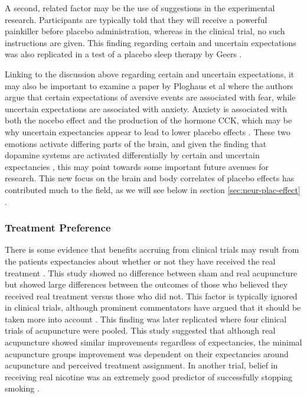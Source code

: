 A second, related factor may be the use of suggestions in the experimental research. Participants are typically told that they will receive a powerful painkiller before placebo administration, whereas in the clinical trial, no such instructions are given. This finding regarding certain and uncertain expectations was also replicated in a test of a placebo sleep therapy by Geers  \cite{Geers2005a}.

Linking to the discussion above regarding certain and uncertain expectations, it may also be important to examine a paper by Ploghaus et al \cite{Ploghaus2003} where the authors argue that certain expectations of aversive events are associated with fear, while uncertain expectations are associated with anxiety. Anxiety is associated with both the nocebo effect and the production of the hormone CCK, which may be why uncertain expectancies appear to lead to lower placebo effects \cite{Colloca2008b}. These two emotions activate differing parts of the brain, and given the finding that dopamine systems are activated differentially by certain and uncertain expectancies \cite{Scott2007a}, this may point towards some important future avenues for research. This new focus on the brain and body correlates of placebo effects has contributed much to the field, as we will see below in section \ref{sec:neur-plac-effect} .

\subsubsection{Treatment Preference}
\label{sec:treatment-preference}


There is some evidence that benefits accruing from clinical trials may result from the patients expectancies about whether or not they have received the real treatment \cite{Bausell2005}. This study showed no difference between sham and real acupuncture but showed large differences between the outcomes of those who believed they received real treatment versus those who did not. This factor is typically ignored in clinical trials, although prominent commentators have argued that it should be taken more into account \cite{Benedetti2007}. This finding was later replicated \cite{Linde2007}  where four clinical trials of acupuncture were pooled. This study suggested that although real acupuncture showed similar improvements regardless of expectancies, the minimal acupuncture groups improvement was dependent on their expectancies around acupuncture and perceived treatment assignment. In another trial, belief in receiving real nicotine was an extremely good predictor of successfully stopping smoking \cite{Benedetti2008}. 

